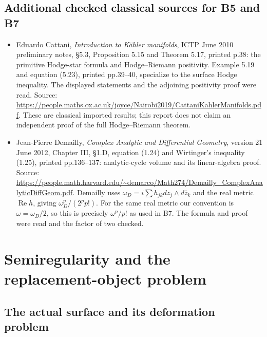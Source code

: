 \documentclass[11pt,a4paper]{article}
\providecommand{\tightlist}{\setlength{\itemsep}{0pt}\setlength{\parskip}{0pt}}
\theoremstyle{definition}
\begin{document}
\subsection{Additional checked classical sources for B5 and
B7}\label{additional-checked-classical-sources-for-b5-and-b7}

\begin{itemize}
\tightlist
\item
  Eduardo Cattani, \emph{Introduction to Kähler manifolds}, ICTP June
  2010 preliminary notes, §5.3, Proposition 5.15 and Theorem 5.17,
  printed p.38: the primitive Hodge-star formula and Hodge--Riemann
  positivity. Example 5.19 and equation (5.23), printed pp.39--40,
  specialize to the surface Hodge inequality. The displayed statements
  and the adjoining positivity proof were read. Source:
  \url{https://people.maths.ox.ac.uk/joyce/Nairobi2019/CattaniKahlerManifolds.pdf}.
  These are classical imported results; this report does not claim an
  independent proof of the full Hodge--Riemann theorem.
\item
  Jean-Pierre Demailly, \emph{Complex Analytic and Differential
  Geometry}, version 21 June 2012, Chapter III, §1.D, equation (1.24)
  and Wirtinger's inequality (1.25), printed pp.136--137: analytic-cycle
  volume and its linear-algebra proof. Source:
  \url{https://people.math.harvard.edu/~demarco/Math274/Demailly_ComplexAnalyticDiffGeom.pdf}.
  Demailly uses \(\omega_D=i\sum h_{jk}dz_j\wedge d\bar z_k\) and the
  real metric \(\operatorname{Re}h\), giving \(\omega_D^p/(2^p p!)\).
  For the same real metric our convention is \(\omega=\omega_D/2\), so
  this is precisely \(\omega^p/p!\) as used in B7. The formula and proof
  were read and the factor of two checked.
\end{itemize}

\section{Semiregularity and the replacement-object problem}


\subsection{The actual surface and its deformation problem}
\end{document}
